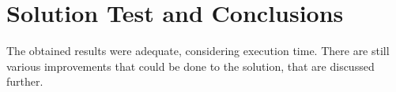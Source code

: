 \documentclass[header]{subfiles}
\providecommand{\rootdir}{.}
\begin{document}
\chapter{Solution Test and Conclusions}
\label{chapter:test}




\noindent
The obtained results were adequate, considering execution time. There are still
various improvements that could be done to the solution, that are discussed
further.
\end{document}
